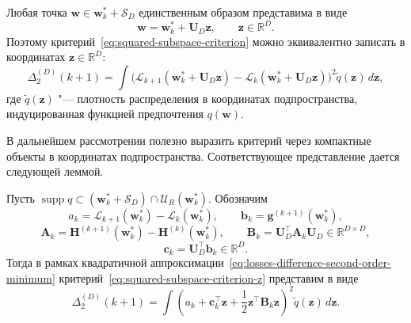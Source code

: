 \begin{remark}
    \label{rem:squared-subspace-coordinates}
    Любая точка $\mathbf w \in \mathbf w_k^* + \mathcal S_D$ единственным образом представима в виде
    \begin{equation}
        \mathbf w = \mathbf w_k^* + \mathbf U_D \mathbf z,
        \qquad
        \mathbf z \in \mathbb R^D.
    \end{equation}
    Поэтому критерий~\eqref{eq:squared-subspace-criterion} можно эквивалентно записать в координатах $\mathbf z \in \mathbb R^D$:
    \begin{equation}
        \label{eq:squared-subspace-criterion-z}
        \Delta_{2}^{(D)}(k+1)
        =
        \int
        \big(
            \mathcal L_{k+1}(\mathbf w_k^* + \mathbf U_D \mathbf z)
            -
            \mathcal L_k(\mathbf w_k^* + \mathbf U_D \mathbf z)
        \big)^2
        \tilde q(\mathbf z)\, d\mathbf z,
    \end{equation}
    где $\tilde q(\mathbf z)$ "--- плотность распределения в координатах подпространства, индуцированная функцией предпочтения $q(\mathbf w)$.
\end{remark}

В дальнейшем рассмотрении полезно выразить критерий через компактные объекты в координатах подпространства. Соответствующее представление дается следующей леммой.

\begin{lemma}
    \label{lemma:squared-subspace-general-reduction}
    Пусть $\operatorname{supp} q \subset (\mathbf w_k^* + \mathcal S_D)\cap \mathcal U_R(\mathbf w_k^*)$. Обозначим
    \begin{equation}
        a_k
        =
        \mathcal L_{k+1}(\mathbf w_k^*)
        -
        \mathcal L_k(\mathbf w_k^*),
        \qquad
        \mathbf b_k
        =
        \mathbf g^{(k+1)}(\mathbf w_k^*),
    \end{equation}
    \begin{equation}
        \mathbf A_k
        =
        \mathbf H^{(k+1)}(\mathbf w_k^*)
        -
        \mathbf H^{(k)}(\mathbf w_k^*),
        \qquad
        \mathbf B_k
        =
        \mathbf U_D^\top \mathbf A_k \mathbf U_D \in \mathbb R^{D\times D},
    \end{equation}
    \begin{equation}
        \mathbf c_k
        =
        \mathbf U_D^\top \mathbf b_k \in \mathbb R^D.
    \end{equation}
    Тогда в рамках квадратичной аппроксимации~\eqref{eq:losses-difference-second-order-minimum} критерий~\eqref{eq:squared-subspace-criterion-z} представим в виде
    \begin{equation}
        \label{eq:squared-subspace-general-reduction}
        \Delta_{2}^{(D)}(k+1)
        =
        \int
        \left(
            a_k
            +
            \mathbf c_k^\top \mathbf z
            +
            \frac12 \mathbf z^\top \mathbf B_k \mathbf z
        \right)^2
        \tilde q(\mathbf z)\, d\mathbf z.
    \end{equation}
\end{lemma}

